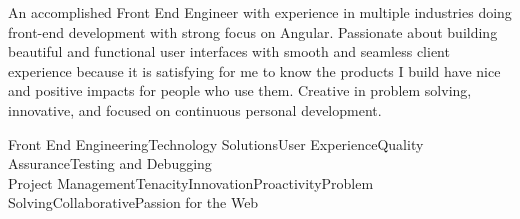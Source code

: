 

\begin{cvparagraph}

An accomplished Front End Engineer with experience in multiple industries doing front-end development with strong focus on Angular. Passionate about building beautiful and functional user interfaces with smooth and seamless client experience because it is satisfying for me to know the products I build have nice and positive impacts for people who use them. Creative in problem solving, innovative, and focused on continuous personal development.

\begin{center}
\newcommand{\separator}{\space\textbar\space}
Front End Engineering\separator{}Technology Solutions\separator{}User Experience\separator{}Quality Assurance\separator{}Testing and Debugging\\
Project Management\separator{}Tenacity\separator{}Innovation\separator{}Proactivity\separator{}Problem Solving\separator{}Collaborative\separator{}Passion for the Web
\end{center}%
\end{cvparagraph}%